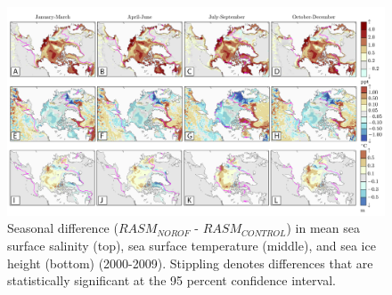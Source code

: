 \documentclass[jgrga, draft]{agutex}
\begin{document}
\clearpage
\begin{figure}
\noindent\includegraphics[width=40pc,natwidth=1]{ocean_combine}
\caption{Seasonal difference ($RASM_{NOROF}$ - $RASM_{CONTROL}$) in mean sea surface salinity (top), sea surface temperature (middle), and sea ice height (bottom) (2000-2009). Stippling denotes differences that are statistically significant at the 95 percent confidence interval.}
\label{fig:ocean_maps}
\end{figure}

\clearpage
\end{document}
